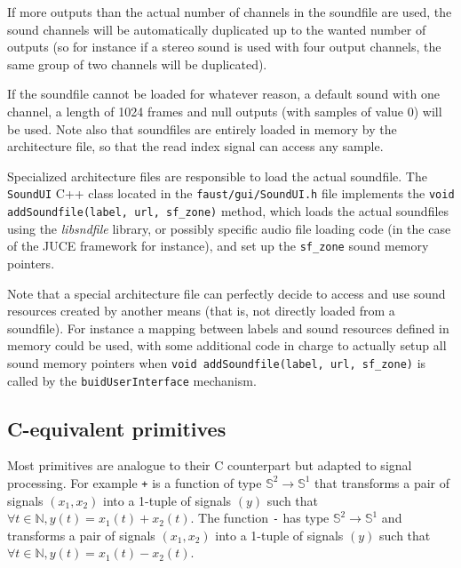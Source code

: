 If more outputs than the actual number of channels in the soundfile are used, the sound channels will be automatically duplicated up to the wanted number of outputs (so for instance if a stereo sound is used with four output channels, the same group of two channels will be duplicated).

If the soundfile cannot be loaded for whatever reason, a default sound with one channel, a length of 1024 frames and null outputs (with samples of value 0) will be used. Note also that soundfiles are entirely loaded in memory by the architecture file, so that the read index signal can access any sample.

Specialized architecture files are responsible to load the actual soundfile. The \lstinline'SoundUI' C++ class located in the \lstinline'faust/gui/SoundUI.h' file implements the \lstinline'void addSoundfile(label, url, sf_zone)' method, which loads the actual soundfiles using the {\it libsndfile} library, or possibly specific audio file loading code (in the case of the JUCE framework for instance), and set up the \lstinline'sf_zone' sound memory pointers.

Note that a special architecture file can perfectly decide to access and use sound resources created by another means (that is, not directly loaded from a soundfile). For instance a mapping between labels and sound resources defined in memory could be used, with some additional code in charge to actually setup all sound memory pointers when \lstinline'void addSoundfile(label, url, sf_zone)' is called by the \lstinline'buidUserInterface' mechanism.

\subsection{C-equivalent primitives}

Most \faust primitives are analogue to their C counterpart but adapted to signal processing.
For example \lstinline|+| is a function of type $\mathbb{S}^{2}\rightarrow\mathbb{S}^{1}$ that transforms a pair of signals $(x_1,x_2)$ into a 1-tuple of signals $(y)$ such that $\forall t\in\mathbb{N}, y(t)=x_{1}(t)+x_{2}(t)$. The function \lstinline|-| has type $\mathbb{S}^{2}\rightarrow\mathbb{S}^{1}$ and transforms a pair of signals $(x_1,x_2)$ into a 1-tuple of signals $(y)$ such that $\forall t\in\mathbb{N}, y(t)=x_{1}(t)-x_{2}(t)$.

